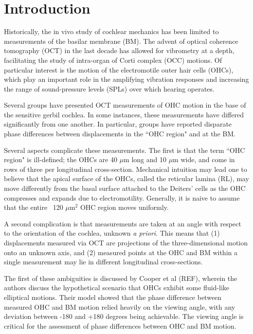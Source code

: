 \documentclass[aip,cp,amsmath,amssymb,reprint]{revtex4-2}
\begin{document}
\section{\label{sec:intro}Introduction}
\par{Historically, the in vivo study of cochlear mechanics has been limited to measurements of the basilar membrane (BM). The advent of optical coherence tomography (OCT) in the last decade has allowed for vibrometry at a depth, facilitating the study of intra-organ of Corti complex (OCC) motions. Of particular interest is the motion of the electromotile outer hair cells (OHCs), which play an important role in the amplifying vibration responses and increasing the range of sound-pressure levels (SPLs) over which hearing operates.}
\par{Several groups have presented OCT measurements of OHC motion in the base of the sensitive gerbil cochlea. In some instances, these measurements have differed significantly from one another. In particular, groups have reported disparate phase differences between displacements in the ``OHC region" and at the BM.}
\par{Several aspects complicate these measurements. The first is that the term ``OHC region" is ill-defined; the OHCs are 40 $\mu$m long and 10 $\mu$m wide, and come in rows of three per longitudinal cross-section. Mechanical intuition may lead one to believe that the apical surface of the OHCs, called the reticular lamina (RL), may move differently from the basal surface attached to the Deiters' cells as the OHC compresses and expands due to electromotility. Generally, it is naive to assume that the entire ~120 $\mu$m$^2$ OHC region moves uniformly.}
\par{A second complication is that measurements are taken at an angle with respect to the orientation of the cochlea, unknown \textit{a priori}. This means that (1) displacements measured via OCT are projections of the three-dimensional motion onto an unknown axis, and (2) measured points at the OHC and BM within a single measurement may lie in different longitudinal cross-sections.}
\par{The first of these ambiguities is discussed by Cooper et al (REF), wherein the authors discuss the hypothetical scenario that OHCs exhibit some fluid-like elliptical motions. Their model showed that the phase difference between measured OHC and BM motion relied heavily on the viewing angle, with any deviation between -180 and +180 degrees being achievable. The viewing angle is critical for the assessment of phase differences between OHC and BM motion.}
\end{document}
